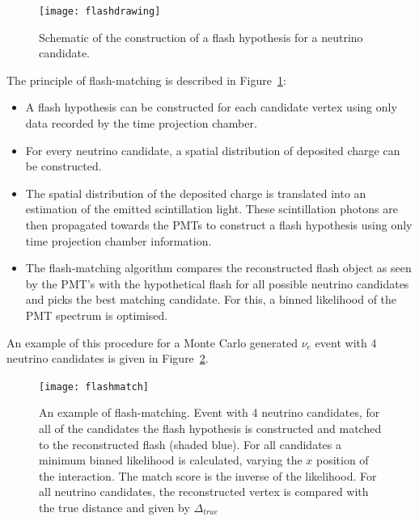 \begin{figure}[!htbp]
\centering
\texttt{[image: flashdrawing]} 
\caption{Schematic of the construction of a flash hypothesis for a neutrino candidate.} 
\label{fig:flashdrawing}
\end{figure}

The principle of flash-matching is described in Figure~\ref{fig:flashdrawing}:
\begin{itemize}
\item A flash hypothesis can be constructed for each candidate vertex using only data recorded by the time projection chamber.
\item For every neutrino candidate, a spatial distribution of deposited charge can be constructed.
\item The spatial distribution of the deposited charge is translated into an estimation of the emitted scintillation light. These scintillation photons are then propagated towards the PMTs to construct a flash hypothesis using only time projection chamber information.
\item The flash-matching algorithm compares the reconstructed flash object as seen by the PMT's with the hypothetical flash for all possible neutrino candidates and picks the best matching candidate. For this, a binned likelihood of the PMT spectrum is optimised.
\end{itemize}
An example of this procedure for a Monte Carlo generated $\nu_e$ event with 4 neutrino candidates is given in Figure~\ref{fig:flashmatch}.
\begin{figure}[!htbp]
\centering
\texttt{[image: flashmatch]} 
\caption{An example of flash-matching. Event with 4 neutrino candidates, for all of the candidates the flash hypothesis is constructed and matched to the reconstructed flash (shaded blue). For all candidates a minimum binned likelihood is calculated, varying the $x$ position of the interaction. The match score is the inverse of the likelihood. For all neutrino candidates, the reconstructed vertex is compared with the true distance and given by $\Delta_{true}$ } 
\label{fig:flashmatch}
\end{figure}


